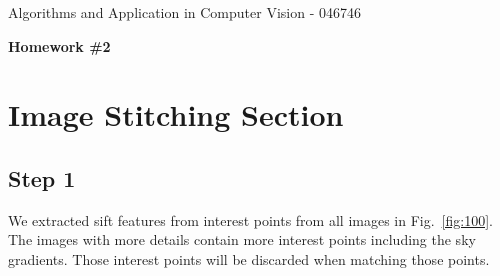 \documentclass[a4paper]{iacas}
\begin{document}
\begin{center}
 \large Algorithms and Application in Computer Vision - 046746
 \end{center}
\begin{center}
\large\textbf{Homework \#2}
 \end{center}



\vspace{2em}

\section{Image Stitching Section}

\subsection{Step 1}

We extracted sift features from interest points from all images in Fig.~\ref{fig:100}. The images with more details contain more interest points including the sky gradients. Those interest points will be discarded when matching those points.
\end{document}
